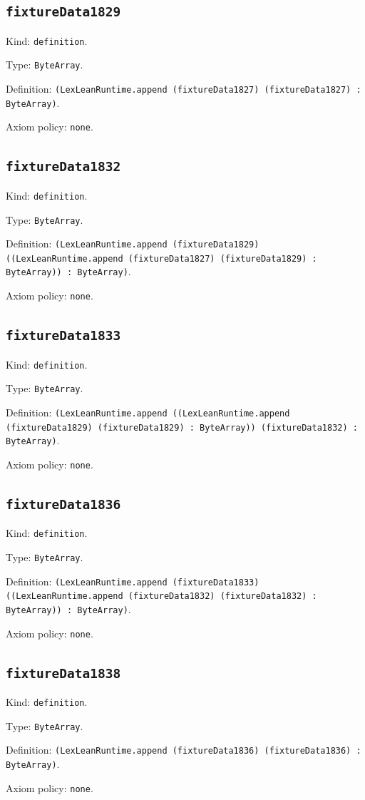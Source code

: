\documentclass[11pt]{article}
\begin{document}
\subsection*{\texttt{fixtureData1829}}
\noindent Kind: \texttt{definition}.\par
\noindent Type: \texttt{ByteArray}.\par
\noindent Definition: \texttt{(LexLeanRuntime.append (fixtureData1827) (fixtureData1827) : ByteArray)}.\par
\noindent Axiom policy: \texttt{none}.\par
\subsection*{\texttt{fixtureData1832}}
\noindent Kind: \texttt{definition}.\par
\noindent Type: \texttt{ByteArray}.\par
\noindent Definition: \texttt{(LexLeanRuntime.append (fixtureData1829) ((LexLeanRuntime.append (fixtureData1827) (fixtureData1829) : ByteArray)) : ByteArray)}.\par
\noindent Axiom policy: \texttt{none}.\par
\subsection*{\texttt{fixtureData1833}}
\noindent Kind: \texttt{definition}.\par
\noindent Type: \texttt{ByteArray}.\par
\noindent Definition: \texttt{(LexLeanRuntime.append ((LexLeanRuntime.append (fixtureData1829) (fixtureData1829) : ByteArray)) (fixtureData1832) : ByteArray)}.\par
\noindent Axiom policy: \texttt{none}.\par
\subsection*{\texttt{fixtureData1836}}
\noindent Kind: \texttt{definition}.\par
\noindent Type: \texttt{ByteArray}.\par
\noindent Definition: \texttt{(LexLeanRuntime.append (fixtureData1833) ((LexLeanRuntime.append (fixtureData1832) (fixtureData1832) : ByteArray)) : ByteArray)}.\par
\noindent Axiom policy: \texttt{none}.\par
\subsection*{\texttt{fixtureData1838}}
\noindent Kind: \texttt{definition}.\par
\noindent Type: \texttt{ByteArray}.\par
\noindent Definition: \texttt{(LexLeanRuntime.append (fixtureData1836) (fixtureData1836) : ByteArray)}.\par
\noindent Axiom policy: \texttt{none}.\par
\end{document}
